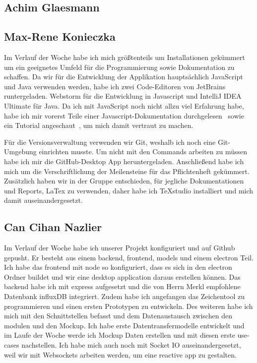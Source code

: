 \documentclass[]{article}
\begin{document}
\subsection{Achim Glaesmann}

\subsection{Max-Rene Konieczka}
Im Verlauf der Woche habe ich mich größtenteils um Installationen gekümmert um ein geeignetes Umfeld für die Programmierung sowie Dokumentation zu schaffen. Da wir für die Entwicklung der Applikation hauptsächlich JavaScript und Java verwenden werden, habe ich zwei Code-Editoren von JetBrains runtergeladen. Webstorm für die Entwicklung in Javascript und IntelliJ IDEA Ultimate für Java. Da ich mit JavaScript noch nicht allzu viel Erfahrung habe, habe ich mir vorerst Teile einer Javascript-Dokumentation durchgelesen~\cite{javascript_doc} sowie ein Tutorial angeschaut~\cite{javascript_tut}, um mich damit vertraut zu machen.

Für die Versionsverwaltung verwenden wir Git, weshalb ich noch eine Git-Umgebung einrichten musste. Um nicht mit den Commands arbeiten zu müssen habe ich mir die GitHub-Desktop App heruntergeladen. 
Anschließend habe ich mich um die Verschriftlichung der Meilensteine für das Pflichtenheft gekümmert. Zusätzlich haben wir in der Gruppe entschieden, für jegliche Dokumentationen und Reports, LaTex zu verwenden, daher habe ich TeXstudio installiert und mich damit auseinandergesetzt. 

\subsection{Can Cihan Nazlier}
Im Verlauf der Woche habe ich unserer Projekt konfiguriert und auf Github gepusht. Er besteht aus einem backend, frontend, models und einem electron Teil. Ich habe das frontend mit node so konfiguriert, dass es sich in den electron Ordner buildet und wir eine desktop application daraus erstellen können. Das backend habe ich mit express aufgesetzt und die von Herrn Merkl empfohlene Datenbank influxDB integriert. Zudem habe ich angefangen das Zeichentool zu programmieren und einen ersten Prototypen zu entwickeln. Des weiteren habe ich mich mit den Schnittstellen befasst und dem Datenaustausch zwischen den modulen und den Mockup. Ich habe erste Datentransfermodelle entwickelt und im Laufe der Woche werde ich Mockup Daten erstellen und mit diesen erste use-cases nachstellen. Ich habe mich auch noch mit Socket IO auseinandergesetzt, weil wir mit Websockets arbeiten werden, um eine reactive app zu gestalten.

\printbibliography
\end{document}
